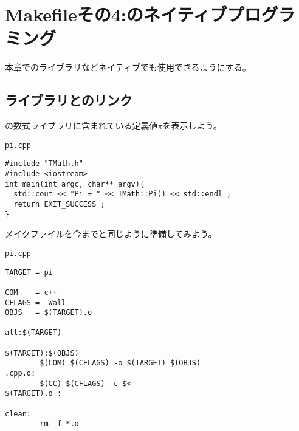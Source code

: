  \section{Makefileその4:\ROOT のネイティブプログラミング}
 
 
 
 本章で\ROOT のライブラリなどネイティブでも使用できるようにする。
 
  \subsection{\ROOT ライブラリとのリンク}
  
  \ROOT の数式ライブラリに含まれている定義値$\pi$を表示しよう。
  \begin{itembox}{\texttt{pi.cpp}}
\begin{verbatim}
#include "TMath.h"
#include <iostream>
int main(int argc, char** argv){
  std::cout << "Pi = " << TMath::Pi() << std::endl ;
  return EXIT_SUCCESS ;
}
\end{verbatim}
  \end{itembox}
  メイクファイルを今までと同じように準備してみよう。
  \begin{itembox}{\texttt{pi.cpp}}
\begin{verbatim}
TARGET = pi

COM    = c++
CFLAGS = -Wall
OBJS   = $(TARGET).o

all:$(TARGET)

$(TARGET):$(OBJS)
        $(COM) $(CFLAGS) -o $(TARGET) $(OBJS)
.cpp.o:
        $(CC) $(CFLAGS) -c $<
$(TARGET).o :

clean:
        rm -f *.o
\end{verbatim}
  \end{itembox}
  
